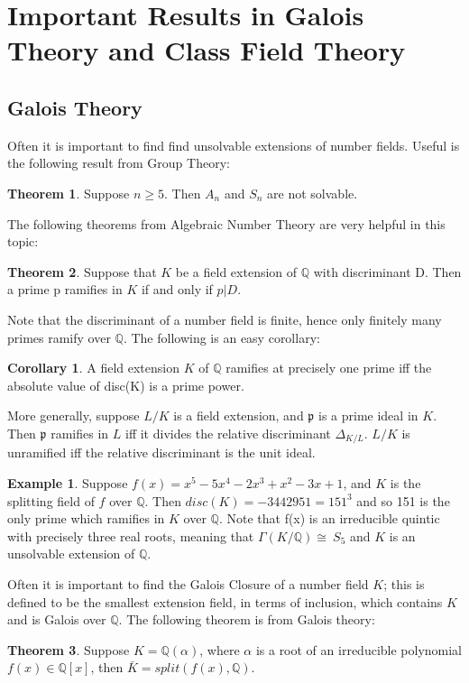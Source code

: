 \documentclass[12pt]{extarticle}
\newcommand{\Q}{\mathbb{Q}}
\newcommand{\GG}{\Gamma(K/\mathbb{Q})}
\newcommand{\spl}{split(f(x),\mathbb{Q})}
\newcommand{\<}{\langle}
\renewcommand{\>}{\rangle}
\theoremstyle{definition}
\newtheorem{theorem}{Theorem}
\newtheorem{corollary}{Corollary}
\newtheorem*{example}{Example}
\begin{document}
\section{Important Results in Galois Theory and Class Field Theory}
\subsection{Galois Theory}


Often it is important to find find unsolvable extensions of number fields. Useful is the following result from Group Theory:
\begin{theorem}
Suppose $n \geq 5$. Then $A_n$ and $S_n$ are not solvable. 
\end{theorem}
The following theorems from Algebraic Number Theory are very helpful in this topic:
\begin{theorem}
 Suppose that $K$ be a field extension of $\Q$ with discriminant D. Then a prime p
ramifies in $K$ if and only if $p|D$.   
\end{theorem}
Note that the discriminant of a number field is finite, hence only finitely many primes ramify over $\Q$. The following is an easy corollary:
\begin{corollary}
A field extension $K$ of $\Q$ ramifies at precisely one prime iff the absolute value of disc(K) is a prime power.
\end{corollary}
More generally, suppose $L/K$ is a field extension, and $\mathfrak{p}$ is a prime ideal in $K$. Then $\mathfrak{p}$ ramifies in $L$ iff it divides the relative discriminant $\Delta_{K/L}$. $L/K$ is unramified iff the relative discriminant is the unit ideal. 
\begin{example}
    Suppose $f(x)=x^5-5x^4-2x^3+x^2-3x+1$, and $K$ is the splitting field of $f$ over $\Q$. Then $disc(K)=-3442951=151^3$ and so 151 is the only prime which ramifies in $K$ over $\Q$. Note that f(x) is an irreducible quintic with precisely three real roots, meaning that $\GG \cong\ S_5$ and $K$ is an unsolvable extension of $\Q$.
\end{example}

Often it is important to find the Galois Closure of a number field $K$;  this is defined to be the smallest extension field, in terms of inclusion, which contains $K$ and is Galois over $\Q$. The following theorem is  from Galois theory: \begin{theorem}
  Suppose $K=\Q(\alpha)$, where $\alpha$ is a root of an irreducible polynomial $f(x) \in \Q[x]$, then $\bar{K} = \spl$.
\end{theorem}
\end{document}
